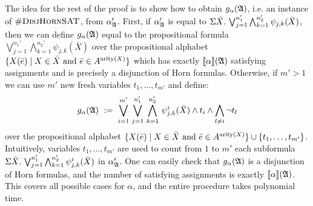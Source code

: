 The idea for the rest of the proof is to show how to obtain $g_{\alpha}(\mathfrak{A})$, i.e. an instance of $\textsc{\#DisjHornSAT}$, from $\alpha_{\mathfrak{A}}'$.
First, if $\alpha_{\mathfrak{A}}'$ is equal to $\Sigma{\bar{X}}.\,\bigvee_{j = 1}^{n_1'}\bigwedge_{k = 1}^{n_2'}\psi_{j,k}(\bar{X})$, then we can define $g_{\alpha}(\mathfrak{A})$ equal to the propositional formula $\bigvee_{j = 1}^{n_1'}\bigwedge_{k = 1}^{n_2'}\psi_{j,k}(\bar{X})$ over the propositional alphabet $\{X(\bar{e}) \mid X \in \bar{X} \text{ and } \bar{e}\in A^{{\rm arity}(X)} \}$ which has exactly ${\llbracket{}{\alpha}\rrbracket}(\mathfrak{A})$ satisfying assignments and is precisely a disjunction of Horn formulas.
Otherwise, if $m' > 1$ we can use $m'$ new fresh variables $t_1,\ldots,t_{m'}$ and define:
$$
g_{\alpha}(\A) \ := \ \bigvee_{i=1}^{m'} \, \bigvee_{j = 1}^{n_1'} \, \bigwedge_{k = 1}^{n_2'} \, \psi^i_{j,k}(\bar{X}) \wedge t_i \wedge \bigwedge_{l \neq i} \neg t_l
$$ 
over the propositional alphabet $\{X(\bar{e}) \mid X \in \bar{X} \text{ and } \bar{e}\in A^{{\rm arity}(X)} \} \cup \{t_1,\ldots,t_{m'}\}$.
Intuitively, variables $t_1,\ldots,t_{m'}$ are used to count from $1$ to $m'$ each subformula $\Sigma{\bar{X}}.\,\bigvee_{j = 1}^{n_1'}\bigwedge_{k = 1}^{n_2'}\psi^{i}_{j,k}(\bar{X})$ in $\alpha_{\mathfrak{A}}'$.
One can easily check that $g_{\alpha}(\mathfrak{A})$ is a disjunction of Horn formulas, and the number of satisfying assignments is exactly ${\llbracket{}{\alpha}\rrbracket}(\mathfrak{A})$. This covers all possible cases for $\alpha$, and the entire procedure takes polynomial time.